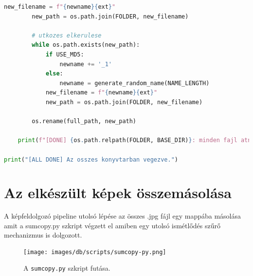 \documentclass[	
  noindent
]{elteikthesis}[2024/04/26]
\begin{document}
\begin{lstlisting}[language={Python}]
        new_filename = f"{newname}{ext}"
        new_path = os.path.join(FOLDER, new_filename)

        # utkozes elkerulese
        while os.path.exists(new_path):
            if USE_MD5:
                newname += '_1'
            else:
                newname = generate_random_name(NAME_LENGTH)
            new_filename = f"{newname}{ext}"
            new_path = os.path.join(FOLDER, new_filename)

        os.rename(full_path, new_path)

    print(f"[DONE] {os.path.relpath(FOLDER, BASE_DIR)}: minden fajl atnevezve.")

print("[ALL DONE] Az osszes konyvtarban vegezve.") 
    \end{lstlisting}

  \section{Az elkészült képek összemásolása}
  A képfeldolgozó pipeline utolsó lépése az összes .jpg fájl egy mappába másolása amit a sumcopy.py szkript végzett el amiben egy utolsó ismétlődés szűrő mechanizmus is dolgozott.

  \begin{figure}[H]
      \centering
      \texttt{[image: images/db/scripts/sumcopy-py.png]}
      \caption{A \texttt{sumcopy.py} szkript futása.}
      \label{fig:03-sumcopy.py}
  \end{figure}
\end{document}
